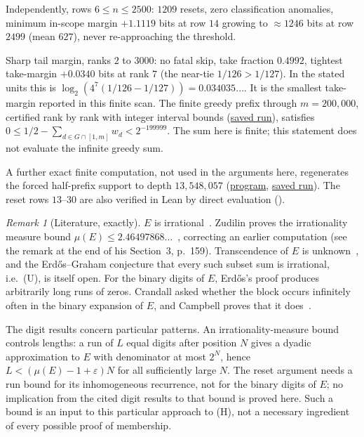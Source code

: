 \documentclass[11pt]{article}
\theoremstyle{plain}
\theoremstyle{definition}
\theoremstyle{remark}
\newtheorem{rem}[thm]{Remark}
\newcommand{\lean}[2]{\leanlink{#2}}
\let\origtexttt\texttt
\renewcommand{\texttt}[1]{\origtexttt{\seqsplit{#1}}}%
\begin{document}
Independently, rows $6 \le n \le 2500$: $1209$ resets, zero classification
anomalies, minimum in-scope margin $+1.1119$ bits at row $14$ growing to $\approx 1246$ bits at row
$2499$ (mean $627$), never re-approaching the threshold.

Sharp tail margin, ranks $2$ to $3000$: no
fatal skip, take fraction $0.4992$, tightest take-margin $+0.0340$ bits at rank $7$ (the near-tie
$1/126>1/127$).  In the stated units this is
$\log_2(4^7(1/126-1/127))=0.034035\ldots$.
It is the smallest take-margin reported in this finite scan. The finite greedy prefix through $m=200{,}000$, certified rank by rank
with integer interval bounds
(\href{https://github.com/wcook04/plectis-erdos/blob/f757115e03bebe5c04431a147da559015c680a37/research/experiments/erdos257/receipts/greedy-prefix-200000.json}{saved run}),
satisfies
$0\le 1/2-\sum_{d\in G\cap[1,m]}w_d<2^{-199999}$.
The sum here is finite; this statement does not evaluate the infinite greedy sum.

A further exact finite computation, not used in the arguments here,
regenerates the forced half-prefix support to depth $13{,}548{,}057$
(\href{https://github.com/wcook04/plectis-erdos/blob/f757115e03bebe5c04431a147da559015c680a37/research/experiments/erdos257/half_prefix_coefficient_macro_verify.cpp}{program},
\href{https://github.com/wcook04/plectis-erdos/blob/f757115e03bebe5c04431a147da559015c680a37/research/experiments/erdos257/receipts/coefficient-macro-13548057.json}{saved run}).
The reset rows $13$--$30$ are also
verified in Lean by direct evaluation
(\lean{seamUpperResetDyadicBandEscape\_through\_thirty}{HalfCylinderUpperResetBandCertificates.lean:78}).

\begin{rem}[Literature, exactly]
$E$ is irrational~\cite{erdos1948}. Zudilin proves the irrationality measure bound
$\mu(E)\le2.46497868\ldots$~\cite[Theorem~1, p.~154]{zudilin2004}, correcting an earlier
computation (see the remark at the end of his Section~3, p.~159). Transcendence of $E$ is
unknown~\cite[p.~2]{duverneytachiya}, and the Erd\H{o}s--Graham conjecture that every such subset
sum is irrational, i.e.\ (U), is itself open. For the binary digits of $E$, Erd\H{o}s's proof
produces arbitrarily long runs of zeros. Crandall asked whether the block \texttt{11} occurs
infinitely often in the binary expansion of $E$, and Campbell proves that it
does~\cite[Theorem~1, p.~12]{campbell2026}.
\end{rem}

The digit results concern particular patterns. An irrationality-measure
bound controls lengths: a run of $L$ equal digits after position $N$
gives a dyadic approximation to $E$ with denominator at most $2^N$, hence
$L<(\mu(E)-1+\varepsilon)N$ for all sufficiently large $N$.
The reset argument needs a run bound for its inhomogeneous recurrence,
not for the binary digits of $E$; no implication from the cited digit
results to that bound is proved here.
Such a bound is an input to this particular approach to (H), not a
necessary ingredient of every possible proof of membership.
\end{document}
